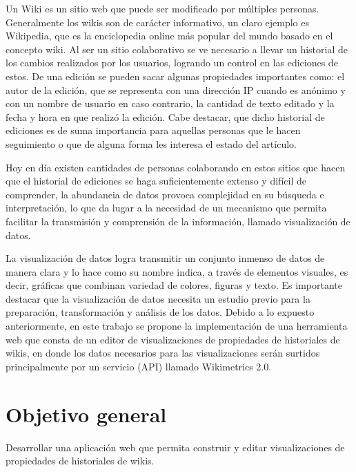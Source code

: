 Un Wiki es un sitio web que puede ser modificado por múltiples personas. Generalmente los wikis son de carácter informativo, un claro ejemplo es Wikipedia, que es la enciclopedia online más popular del mundo basado en el concepto wiki. Al ser un sitio colaborativo se ve necesario a llevar un historial de los cambios realizados por los usuarios, logrando un control en las ediciones de estos. De una edición se pueden sacar algunas propiedades importantes como: el autor de la edición, que se representa con una dirección IP cuando es anónimo y con un nombre de usuario en caso contrario, la cantidad de texto editado y la fecha y hora en que realizó la edición. Cabe destacar, que dicho historial de ediciones es de suma importancia para aquellas personas que le hacen seguimiento o que de alguna forma les interesa el estado del artículo.

Hoy en día existen cantidades de personas colaborando en estos sitios que hacen que el historial de ediciones se haga suficientemente extenso y difícil de comprender, la abundancia de datos provoca complejidad en su búsqueda e interpretación, lo que da lugar a la necesidad de un mecanismo que permita facilitar la transmisión y comprensión de la información, llamado visualización de datos.

La visualización de datos logra transmitir un conjunto inmenso de datos de manera clara y lo hace como su nombre indica, a través de elementos visuales, es decir, gráficas que combinan variedad de colores, figuras y texto. Es importante destacar que la visualización de datos necesita un estudio previo para la preparación, transformación y análisis de los datos. Debido a lo expuesto anteriormente, en este trabajo se propone la implementación de una herramienta web que consta de un editor de visualizaciones de propiedades de historiales de wikis, en donde los datos necesarios para las visualizaciones serán surtidos principalmente por un servicio (API) llamado Wikimetrics 2.0. 

\section{Objetivo general}
Desarrollar una aplicación web que permita construir y editar visualizaciones de propiedades de historiales de wikis.

